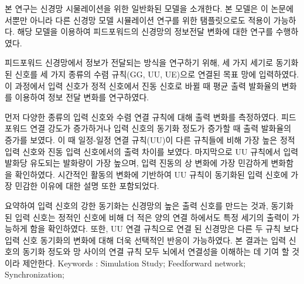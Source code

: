 \documentclass[master,english,final]{kaist-ucs}
\begin{document}
%
%
%

\printbibliography

\begin{summary}

본 연구는 신경망 시물레이션을 위한 일반화된 모델을 소개한다. 본 모델은 이 논문에서뿐만 아니라 다른 신경망 모델 시뮬레이션 연구를 위한 탬플릿으로도 적용이 가능하다. 해당 모델을 이용하여 피드포워드의 신경망의 정보전달 변화에 대한 연구를 수행하였다. 

피드포워드 신경망에서 정보가 전달되는 방식을 연구하기 위해, 세 가지 세기로 동기화된 신호를 세 가지 종류의 수렴 규칙(GG, UU, UE)으로 연결된 목표 망에 입력하였다. 이 과정에서 입력 신호가 정적 신호에서 진동 신호로 바뀔 때 평균 출력 발화율의 변화를 이용하여 정보 전달 변화를 연구하였다.

먼저 다양한 종류의 입력 신호와 수렴 연결 규칙에 대해 출력 변화를 측정하였다. 피드포워드 연결 강도가 증가하거나 입력 신호의 동기화 정도가 증가할 때 출력 발화율의 증가를 보였다. 이 때 일정-일정 연결 규칙(UU)이 다른 규칙들에 비해 가장 높은 정적 입력 신호와 진동 입력 신호에서의 출력 차이를 보였다. 마지막으로 UU 규칙에서 입력 발화당 유도되는 발화량이 가장 높으며, 입력 진동의 상 변화에 가장 민감하게 변화함을 확인하였다. 시간적인 활동의 변화에 기반하여 UU 규칙이 동기화된 입력 신호에 가장 민감한 이유에 대한 설명 또한 포함되었다.

요약하여 입력 신호의 강한 동기화는 신경망의 높은 출력 신호를 만드는 것과, 동기화 된 입력 신호는 정적인 신호에 비해 더 적은 양의 연결 하에서도 특정 세기의 출력이 가능하게 함을 확인하였다. 또한, UU 연결 규칙으로 연결 된 신경망은 다른 두 규칙 보다 입력 신호 동기화의 변화에 대해 더욱 선택적인 반응이 가능하였다. 본 결과는 입력 신호의 동기화 정도와 망 사이의 연결 규칙 모두 뇌에서 연결성을 이해하는 데 기여 할 것이라 제안한다.
\newline
\newline
\newline
\newline
\newline
\newline
\newline
\newline
\newline
\newline
\newline
\newline
\newline
\newline
\newline
\newline
Keywords : Simulation Study; Feedforward network; Synchronization; 
\end{summary}
\end{document}
